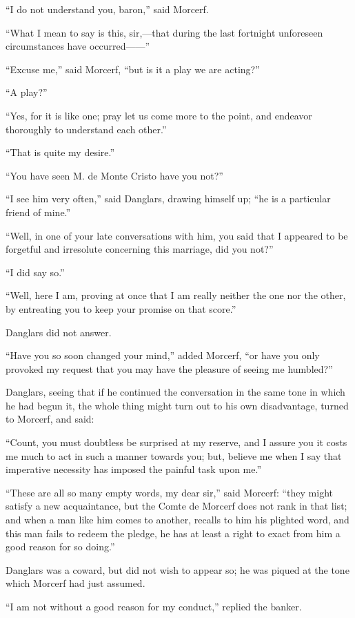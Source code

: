 “I do not understand you, baron,” said Morcerf.

“What I mean to say is this, sir,—that during the last fortnight
unforeseen circumstances have occurred——”

“Excuse me,” said Morcerf, “but is it a play we are acting?”

“A play?”

“Yes, for it is like one; pray let us come more to the point, and
endeavor thoroughly to understand each other.”

“That is quite my desire.”

“You have seen M. de Monte Cristo have you not?”

“I see him very often,” said Danglars, drawing himself up; “he is a
particular friend of mine.”

“Well, in one of your late conversations with him, you said that I
appeared to be forgetful and irresolute concerning this marriage, did
you not?”

“I did say so.”

“Well, here I am, proving at once that I am really neither the one nor
the other, by entreating you to keep your promise on that score.”

Danglars did not answer.

“Have you so soon changed your mind,” added Morcerf, “or have you only
provoked my request that you may have the pleasure of seeing me
humbled?”

Danglars, seeing that if he continued the conversation in the same tone
in which he had begun it, the whole thing might turn out to his own
disadvantage, turned to Morcerf, and said:

“Count, you must doubtless be surprised at my reserve, and I assure you
it costs me much to act in such a manner towards you; but, believe me
when I say that imperative necessity has imposed the painful task upon
me.”

“These are all so many empty words, my dear sir,” said Morcerf: “they
might satisfy a new acquaintance, but the Comte de Morcerf does not
rank in that list; and when a man like him comes to another, recalls to
him his plighted word, and this man fails to redeem the pledge, he has
at least a right to exact from him a good reason for so doing.”

Danglars was a coward, but did not wish to appear so; he was piqued at
the tone which Morcerf had just assumed.

“I am not without a good reason for my conduct,” replied the banker.

